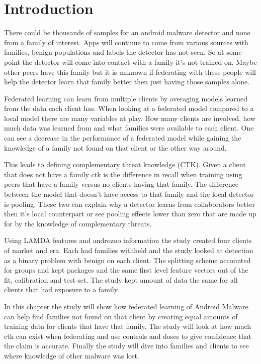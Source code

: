 \documentclass[12pt,letterpaper]{article}
\begin{document}
\clearpage

\section*{Introduction}

There could be thousands of samples for an android malware detector and none from a family of interest. Apps will continue to come from various sources with families, benign populations and labels the detector has not seen. So at some point the detector will come into contact with a family it's not trained on. Maybe other peers have this family but it is unknown if federating with these people will help the detector learn that family better then just having those samples alone.

Federated learning can learn from multiple clients by averaging models learned from the data each client has. When looking at a federated model compared to a local model there are many variables at play. How many clients are involved, how much data was learned from and what families were available to each client. One can see a decrease in the performance of a federated model while gaining the knowledge of a family not found on that client or the other way around.

This leads to defining complementary threat knowledge (CTK). Given a client that does not have a family ctk is the difference in recall when training using peers that have a family versus no clients having that family. The difference between the model that doesn't have access to that family and the local detector is pooling. These two can explain why a detector learns from collaborators better then it's local counterpart or see pooling effects lower than zero that are made up for by the knowledge of complementary threats.

Using LAMDA features and androzoo information the study created four clients of market and era. Each had families withheld and the study looked at detection as a binary problem with benign on each client. The splitting scheme accounted for groups and kept packages and the same first level feature vectors out of the fit, calibration and test set. The study kept amount of data the same for all clients that had exposure to a family.

In this chapter the study will show how federated learning of Android Malware can help find families not found on that client by creating equal amounts of training data for clients that have that family. The study will look at how much ctk can exist when federating and use controls and doses to give confidence that the claim is accurate. Finally the study will dive into families and clients to see where knowledge of other malware was lost.
\end{document}
